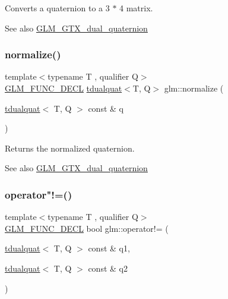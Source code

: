 Converts a quaternion to a 3 $\ast$ 4 matrix.

\begin{DoxySeeAlso}{See also}
\mbox{\hyperlink{group__gtx__dual__quaternion}{G\+L\+M\+\_\+\+G\+T\+X\+\_\+dual\+\_\+quaternion}} 
\end{DoxySeeAlso}
\mbox{\label{group__gtx__dual__quaternion_ga299b8641509606b1958ffa104a162cfe}} 
\subsubsection{\texorpdfstring{normalize()}{normalize()}}
{\footnotesize\ttfamily template$<$typename T , qualifier Q$>$ \\
\mbox{\hyperlink{setup_8hpp_ab2d052de21a70539923e9bcbf6e83a51}{G\+L\+M\+\_\+\+F\+U\+N\+C\+\_\+\+D\+E\+CL}} \mbox{\hyperlink{structglm_1_1tdualquat}{tdualquat}}$<$T, Q$>$ glm\+::normalize (\begin{DoxyParamCaption}\item[{\mbox{\hyperlink{structglm_1_1tdualquat}{tdualquat}}$<$ T, Q $>$ const \&}]{q }\end{DoxyParamCaption})}

Returns the normalized quaternion.

\begin{DoxySeeAlso}{See also}
\mbox{\hyperlink{group__gtx__dual__quaternion}{G\+L\+M\+\_\+\+G\+T\+X\+\_\+dual\+\_\+quaternion}} 
\end{DoxySeeAlso}
\mbox{\label{group__gtx__dual__quaternion_ga41964adca31c6e6b52f1367104d15646}} 
\subsubsection{\texorpdfstring{operator"!=()}{operator!=()}}
{\footnotesize\ttfamily template$<$typename T , qualifier Q$>$ \\
\mbox{\hyperlink{setup_8hpp_ab2d052de21a70539923e9bcbf6e83a51}{G\+L\+M\+\_\+\+F\+U\+N\+C\+\_\+\+D\+E\+CL}} bool glm\+::operator!= (\begin{DoxyParamCaption}\item[{\mbox{\hyperlink{structglm_1_1tdualquat}{tdualquat}}$<$ T, Q $>$ const \&}]{q1,  }\item[{\mbox{\hyperlink{structglm_1_1tdualquat}{tdualquat}}$<$ T, Q $>$ const \&}]{q2 }\end{DoxyParamCaption})}

